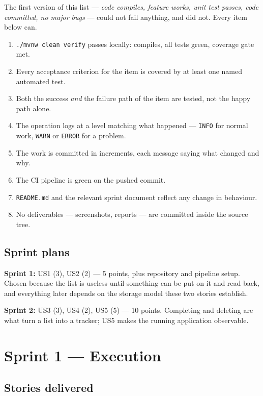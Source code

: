 \documentclass[11pt,a4paper]{article}
\newcommand{\code}[1]{\texttt{\small #1}}
\begin{document}
The first version of this list --- \emph{code compiles, feature works, unit test
passes, code committed, no major bugs} --- could not fail anything, and did
not. Every item below can.

\begin{enumerate}
  \item \code{./mvnw clean verify} passes locally: compiles, all tests green,
        coverage gate met.
  \item Every acceptance criterion for the item is covered by at least one
        named automated test.
  \item Both the success \emph{and} the failure path of the item are tested,
        not the happy path alone.
  \item The operation logs at a level matching what happened --- \code{INFO}
        for normal work, \code{WARN} or \code{ERROR} for a problem.
  \item The work is committed in increments, each message saying what changed
        and why.
  \item The CI pipeline is green on the pushed commit.
  \item \code{README.md} and the relevant sprint document reflect any change in
        behaviour.
  \item No deliverables --- screenshots, reports --- are committed inside the
        source tree.
\end{enumerate}

\subsection{Sprint plans}

\textbf{Sprint 1:} US1 (3), US2 (2) --- 5 points, plus repository and pipeline
setup. Chosen because the list is useless until something can be put on it and
read back, and everything later depends on the storage model these two stories
establish.

\medskip
\noindent\textbf{Sprint 2:} US3 (3), US4 (2), US5 (5) --- 10 points. Completing
and deleting are what turn a list into a tracker; US5 makes the running
application observable.

\section{Sprint 1 --- Execution}

\subsection{Stories delivered}
\end{document}
